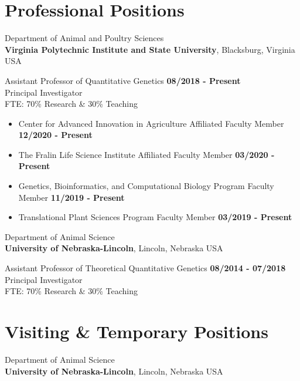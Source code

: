 \documentclass[margin,line,10pt]{res}
\begin{document}
\begin{resume}
\vspace{0.4cm}
\section{\sc Professional Positions}


Department of Animal and Poultry Sciences\\
{\bf Virginia Polytechnic Institute and State University}, Blacksburg, Virginia USA
\vspace{-.3cm}

Assistant Professor of Quantitative Genetics   \hfill {\bf 08/2018 - Present}\\
Principal Investigator \\
FTE: 70\% Research \& 30\% Teaching \\

\begin{itemize}
  \item Center for Advanced Innovation in Agriculture Affiliated Faculty Member  \hfill {\bf 12/2020 - Present}\\
  \item The Fralin Life Science Institute Affiliated Faculty Member  \hfill {\bf 03/2020 - Present}\\
\item Genetics, Bioinformatics, and Computational Biology Program Faculty Member  \hfill {\bf 11/2019 - Present}\\
\item Translational Plant Sciences Program Faculty Member  \hfill {\bf 03/2019 - Present}\\
\end{itemize}

Department of Animal Science\\
{\bf University of Nebraska-Lincoln}, Lincoln, Nebraska USA
\vspace{-.35cm}

Assistant Professor of Theoretical Quantitative Genetics   \hfill {\bf 08/2014 - 07/2018}\\
Principal Investigator \\
FTE: 70\% Research \& 30\% Teaching \\



\vspace{0.4cm}
\section{\sc Visiting \& Temporary Positions}
Department of Animal Science\\
{\bf University of Nebraska-Lincoln}, Lincoln, Nebraska USA
\vspace{-.35cm}


\end{resume}
\end{document}

